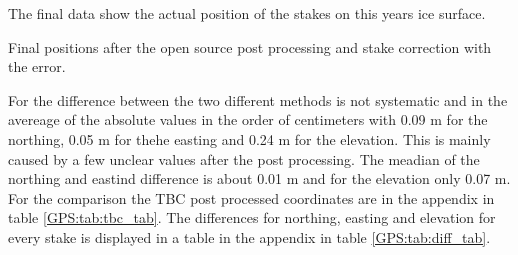 The final data show the actual position of the stakes on this years ice surface.

\begin{table}[H]
	\caption{Final positions after the open source post processing and stake correction with the error.}
	\centering
	
	\label{GPS:tab:os_tab}
\end{table}

For the difference between the two different methods is not systematic and in the avereage of the absolute values in the order of centimeters with 0.09 m for the northing, 0.05 m for thehe  easting and 0.24 m for the elevation. This is mainly caused by a few unclear values after the post processing. The meadian of the northing and eastind difference is about 0.01 m and for the elevation only 0.07 m. For the comparison the TBC post processed coordinates are in the appendix in table \ref{GPS:tab:tbc_tab}.
The differences for northing, easting and elevation for every stake is displayed in a table in the appendix in table \ref{GPS:tab:diff_tab}. 
